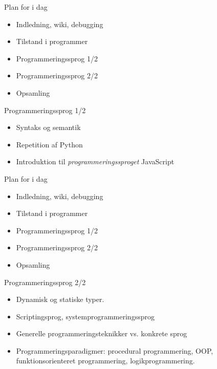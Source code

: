 \documentclass[a4paper,landscape]{slides}
\begin{document}
\begin{slide}
	\begin{center} {\large 
            Plan for i dag
	} \end{center}
	\begin{itemize} \addtolength{\itemsep}{-\baselineskip}
            \item Indledning, wiki, debugging
            \item Tilstand i programmer
            \item Programmeringssprog 1/2
            \item Programmeringssprog 2/2
            \item Opsamling
	\end{itemize}
\end{slide}
\begin{slide}
	\begin{center} {\large 
            Programmeringssprog 1/2
	} \end{center}
	\begin{itemize} \addtolength{\itemsep}{-\baselineskip}
            \item Syntaks og semantik
            \item Repetition af Python
            \item Introduktion til \emph{programmeringssproget} JavaScript 
	\end{itemize}
\end{slide}

\begin{slide}
	\begin{center} {\large 
            Plan for i dag
	} \end{center}
	\begin{itemize} \addtolength{\itemsep}{-\baselineskip}
            \item Indledning, wiki, debugging
            \item Tilstand i programmer
            \item Programmeringssprog 1/2
            \item Programmeringssprog 2/2
            \item Opsamling
	\end{itemize}
\end{slide}
\begin{slide}
	\begin{center} {\large 
            Programmeringssprog 2/2
	} \end{center}
	\begin{itemize} \addtolength{\itemsep}{-\baselineskip}
            \item Dynamisk og statiske typer.
            \item Scriptingsprog, systemprogrammeringssprog
            \item Generelle programmeringsteknikker vs. konkrete sprog
            \item Programmeringsparadigmer: procedural programmering, OOP, funktionsorienteret programmering, logikprogrammering.
	\end{itemize}
\end{slide}
\end{document}
